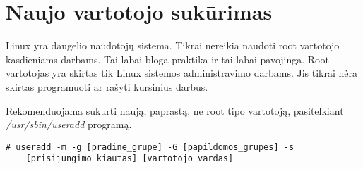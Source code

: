 \chapter{Naujo vartotojo sukūrimas}

  Linux yra daugelio naudotojų sistema. Tikrai nereikia naudoti root
  vartotojo kasdieniams darbams. Tai labai bloga praktika ir tai labai
  pavojinga. Root vartotojas yra skirtas tik Linux sistemos
  administravimo darbams. Jis tikrai nėra skirtas programuoti ar
  rašyti kursinius darbus.

  Rekomenduojama sukurti naują, paprastą, ne root tipo vartotoją,
  pasitelkiant \textsl{/usr/sbin/useradd} programą. 

  \begin{verbatim}
# useradd -m -g [pradine_grupe] -G [papildomos_grupes] -s
    [prisijungimo_kiautas] [vartotojo_vardas]
  \end{verbatim}

